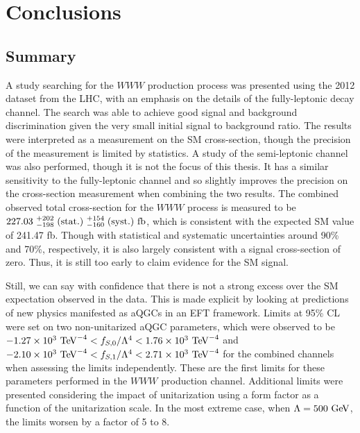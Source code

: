 \chapter{Conclusions}
\label{sec:conclusion}

\section{Summary}
A study searching for the $WWW$ production process 
was presented using the 2012 dataset from the LHC,
with an emphasis on the details of the fully-leptonic
decay channel. The search was able to achieve good signal
and background discrimination given the very small initial
signal to background ratio. The results were interpreted as a
measurement on the SM cross-section, though the precision
of the measurement is limited by statistics. A study of the
semi-leptonic channel was also performed, though it
is not the focus of this thesis. It has a similar sensitivity
to the fully-leptonic channel and so slightly improves the precision
on the cross-section measurement when combining the two results. The 
combined observed total cross-section for the $WWW$
process is measured to be
$227.03 ~ ^{+202}_{-198} \mbox{$\;$(stat.)} ~^{+154}_{-160} \mbox{$\;$(syst.)} ~\textrm{fb}$,
which is consistent with the expected SM value of 241.47 fb.
Though with statistical and systematic uncertainties around
90\% and 70\%, respectively, it is also largely consistent
with a signal cross-section of zero. Thus, it is still too early
to claim evidence for the SM signal.

Still, we can say with confidence that there is not a strong excess over the
SM expectation observed in the data. This is made explicit by looking 
at predictions of new physics manifested as aQGCs
in an EFT framework. Limits at 95\% CL were set on two non-unitarized aQGC parameters,
which were observed 
to be 
$-1.27 \times 10^3 \TeV^{-4} < f_{S,0}/\Lambda^4 < 1.76 \times 10^3 \TeV^{-4}$
and
$-2.10 \times 10^3 \TeV^{-4} < f_{S,1}/\Lambda^4 < 2.71 \times 10^3 \TeV^{-4}$
for the combined channels when assessing the limits independently.
These are the first limits for these parameters performed in the 
$WWW$ production channel. Additional limits were presented
considering the impact of unitarization using a form factor as a function
of the unitarization scale.
In the most extreme case, when $\Lambda = 500 \GeV$, the limits
worsen by a factor of 5 to 8. 


